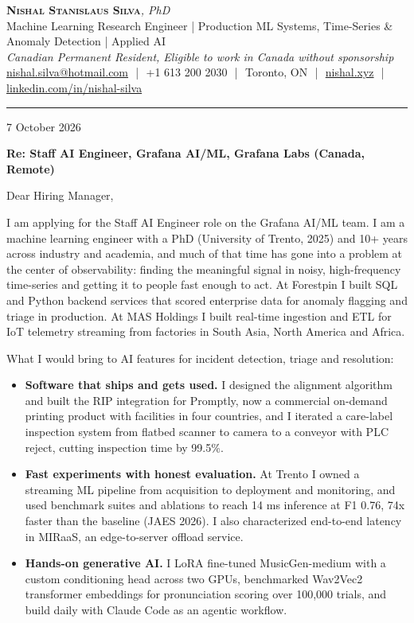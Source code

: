\documentclass[11pt]{article}
\makeatletter
\newcommand{\clName}{Nishal Stanislaus Silva}
\newcommand{\clEmail}{nishal.silva@hotmail.com}
\newcommand{\clPhone}{+1 613 200 2030}
\newcommand{\clCity}{Toronto, ON}
\newcommand{\clSite}{https://nishal.xyz}
\newcommand{\clLinkedIn}{https://www.linkedin.com/in/nishal-silva}
\newcommand{\clStatus}{Canadian Permanent Resident, Eligible to work in Canada without sponsorship}
\newcommand{\clTagline}{Machine Learning Research Engineer | Production ML Systems, Time-Series \& Anomaly Detection | Applied AI}
\newcommand{\clRole}{Staff AI Engineer, Grafana AI/ML}
\newcommand{\clCompany}{Grafana Labs}
\newcommand{\clAddressee}{Dear Hiring Manager,}
\makeatother
\begin{document}
\pagestyle{empty}

\begin{center}
    {\LARGE \scshape \textbf{\clName}}{\large \textit{, PhD}}
    \\[1pt]
    {\small \clTagline}
    \\[1pt]
    {\footnotesize\textit{\clStatus}}
    \\[1pt]
    {\small
    \href{mailto:\clEmail}{\clEmail}
    \,\,|\,\, \clPhone
    \,\,|\,\, \clCity
    \,\,|\,\, \href{\clSite}{nishal.xyz}
    \,\,|\,\, \href{\clLinkedIn}{linkedin.com/in/nishal-silva}}
\end{center}

\rule{\linewidth}{0.4pt}\vspace{0.6em}

7 October 2026

\textbf{Re: \clRole{}, \clCompany{} (Canada, Remote)}

\clAddressee

I am applying for the Staff AI Engineer role on the Grafana AI/ML team. I am a machine learning engineer with a PhD (University of Trento, 2025) and 10+ years across industry and academia, and much of that time has gone into a problem at the center of observability: finding the meaningful signal in noisy, high-frequency time-series and getting it to people fast enough to act. At Forestpin I built SQL and Python backend services that scored enterprise data for anomaly flagging and triage in production. At MAS Holdings I built real-time ingestion and ETL for IoT telemetry streaming from factories in South Asia, North America and Africa.

What I would bring to AI features for incident detection, triage and resolution:
\begin{itemize}[leftmargin=1.4em, itemsep=0pt, topsep=2pt]
    \item \textbf{Software that ships and gets used.} I designed the alignment algorithm and built the RIP integration for Promptly, now a commercial on-demand printing product with facilities in four countries, and I iterated a care-label inspection system from flatbed scanner to camera to a conveyor with PLC reject, cutting inspection time by 99.5\%.
    \item \textbf{Fast experiments with honest evaluation.} At Trento I owned a streaming ML pipeline from acquisition to deployment and monitoring, and used benchmark suites and ablations to reach 14 ms inference at F1 0.76, 74x faster than the baseline (JAES 2026). I also characterized end-to-end latency in MIRaaS, an edge-to-server offload service.
    \item \textbf{Hands-on generative AI.} I LoRA fine-tuned MusicGen-medium with a custom conditioning head across two GPUs, benchmarked Wav2Vec2 transformer embeddings for pronunciation scoring over 100,000 trials, and build daily with Claude Code as an agentic workflow.
\end{itemize}
\end{document}
